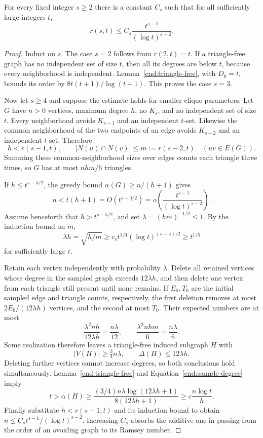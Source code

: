 \begin{proposition}
\label{end:upper-bound}
For every fixed integer $s\ge2$ there is a constant $C_s$ such that
for all sufficiently large integers $t$,
\[
 r(s,t)\le C_s\frac{t^{s-1}}{(\log t)^{s-2}}.
\]
\end{proposition}

\begin{proof}
Induct on $s$. The case $s=2$ follows from $r(2,t)=t$.
If a triangle-free graph has no independent set of size $t$, then all
its degrees are below $t$, because every neighborhood is independent.
Lemma~\ref{end:triangle-free}, with $D_0=t$, bounds its order by
$8t(t+1)/\log(t+1)$. This proves the case $s=3$.

Now let $s\ge4$ and suppose the estimate holds for smaller clique
parameters. Let $G$ have $n>0$ vertices, maximum degree $h$, no $K_s$,
and no independent set of size $t$. Every neighborhood avoids
$K_{s-1}$ and an independent $t$-set. Likewise the common neighborhood
of the two endpoints of an edge avoids $K_{s-2}$ and an independent
$t$-set. Therefore
\[
 h<r(s-1,t),\qquad
 |N(u)\cap N(v)|\le m:=r(s-2,t)\quad(uv\in E(G)).
\]
Summing these common-neighborhood sizes over edges counts each
triangle three times, so $G$ has at most $nhm/6$ triangles.

If $h\le t^{s-5/2}$, the greedy bound
$\alpha(G)\ge n/(h+1)$ gives
\[
 n<t(h+1)=O(t^{s-3/2})
   =o\!\left(\frac{t^{s-1}}{(\log t)^{s-2}}\right).
\]
Assume henceforth that $h>t^{s-5/2}$, and set
$\lambda=(hm)^{-1/2}\le1$. By the induction bound on $m$,
\begin{equation}
 \lambda h=\sqrt{h/m}
 \ge c_s t^{1/4}(\log t)^{(s-4)/2}\ge t^{1/5}
 \label{end:sample-degree}
\end{equation}
for sufficiently large $t$.

Retain each vertex independently with probability $\lambda$.
Delete all retained vertices whose degree in the sampled graph exceeds
$12\lambda h$, and then delete one vertex from each triangle still
present until none remains. If $E_0,T_0$ are the initial sampled edge
and triangle counts, respectively, the first deletion removes at most
$2E_0/(12\lambda h)$ vertices, and the second at most $T_0$.
Their expected numbers are at most
\[
 \frac{\lambda^2nh}{12\lambda h}=\frac{n\lambda}{12},
 \qquad
 \frac{\lambda^3nhm}{6}=\frac{n\lambda}{6}.
\]
Some realization therefore leaves a triangle-free induced subgraph
$H$ with
\[
 |V(H)|\ge\tfrac34n\lambda,
 \qquad \Delta(H)\le12\lambda h.
\]
Deleting further vertices cannot increase degrees, so both conclusions
hold simultaneously.
Lemma~\ref{end:triangle-free} and
Equation~\eqref{end:sample-degree} imply
\[
 t>\alpha(H)
 \ge\frac{(3/4)n\lambda\log(12\lambda h+1)}{8(12\lambda h+1)}
 \ge c\frac{n\log t}{h}.
\]
Finally substitute $h<r(s-1,t)$ and its induction bound to obtain
$n\le C_s t^{s-1}/(\log t)^{s-2}$. Increasing $C_s$ absorbs the
additive one in passing from the order of an avoiding graph to its
Ramsey number.
\end{proof}


